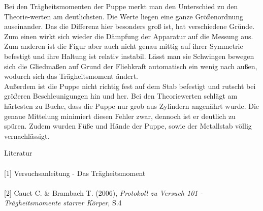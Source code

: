 Bei den Trägheitsmomenten der Puppe merkt man den Unterschied zu den Theorie-werten am deutlichsten. Die Werte liegen eine ganze Größenordnung auseinander. Das die Differenz hier besonders groß ist, hat verschiedene Gründe. Zum einen wirkt sich wieder die Dämpfung der Apparatur auf die Messung aus. Zum anderen ist die Figur aber auch nicht genau mittig auf ihrer Symmetrie befestigt und ihre Haltung ist relativ instabil. Lässt man sie Schwingen bewegen sich die Gliedmaßen auf Grund der Fliehkraft automatisch ein wenig nach außen, wodurch sich das Trägheitsmoment ändert.\\
Außerdem ist die Puppe nicht richtig fest auf dem Stab befestigt und rutscht bei größeren Beschleunigungen hin und her.
Bei den Theoriewerten schlägt am härtesten zu Buche, dass die Puppe nur grob aus Zylindern angenährt wurde. Die genaue Mittelung minimiert diesen Fehler zwar, dennoch ist er deutlich zu spüren. Zudem wurden Füße und Hände der Puppe, sowie der Metallstab völlig vernachlässigt.


\parskip 80pt
\Large{Literatur}\\\\
\large{[1] Versuchsanleitung - Das Trägheitsmoment}\\\\
\large{[2] Cauet C. \& Brambach T. (2006), \textit{Protokoll zu Versuch 101 - Trägheitsmomente starrer Körper}, S.4}\\\\





